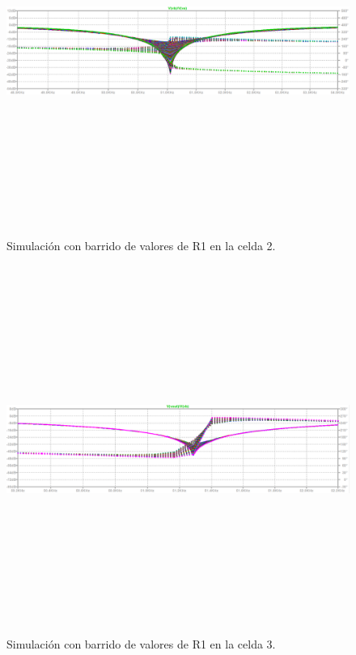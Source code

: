  \begin{figure}[H] %
	\centering	\includegraphics[width=12cm,height=12cm,keepaspectratio]{../EJ4/graficos/etapa2_R1cambiada.png}
	\caption{Simulaci\'on con barrido de valores de R1 en la celda 2.}
	\label{celda2_r1}
\end{figure}

 \begin{figure}[H] %
	\centering	\includegraphics[width=12cm,height=12cm,keepaspectratio]{../EJ4/graficos/etapa3_R1.png}
	\caption{Simulaci\'on con barrido de valores de R1 en la celda 3.}
	\label{celda3_r1}
\end{figure}

